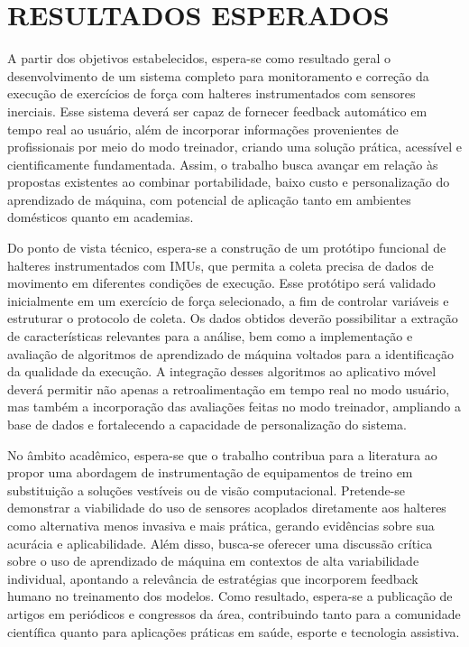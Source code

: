 \chapter{RESULTADOS ESPERADOS}
\label{cap:resultados}

A partir dos objetivos estabelecidos, espera-se como resultado geral o desenvolvimento de um sistema completo para monitoramento e correção da execução de exercícios de força com halteres instrumentados com sensores inerciais. Esse sistema deverá ser capaz de fornecer feedback automático em tempo real ao usuário, além de incorporar informações provenientes de profissionais por meio do modo treinador, criando uma solução prática, acessível e cientificamente fundamentada. Assim, o trabalho busca avançar em relação às propostas existentes ao combinar portabilidade, baixo custo e personalização do aprendizado de máquina, com potencial de aplicação tanto em ambientes domésticos quanto em academias.  

Do ponto de vista técnico, espera-se a construção de um protótipo funcional de halteres instrumentados com IMUs, que permita a coleta precisa de dados de movimento em diferentes condições de execução. Esse protótipo será validado inicialmente em um exercício de força selecionado, a fim de controlar variáveis e estruturar o protocolo de coleta. Os dados obtidos deverão possibilitar a extração de características relevantes para a análise, bem como a implementação e avaliação de algoritmos de aprendizado de máquina voltados para a identificação da qualidade da execução. A integração desses algoritmos ao aplicativo móvel deverá permitir não apenas a retroalimentação em tempo real no modo usuário, mas também a incorporação das avaliações feitas no modo treinador, ampliando a base de dados e fortalecendo a capacidade de personalização do sistema.  

No âmbito acadêmico, espera-se que o trabalho contribua para a literatura ao propor uma abordagem de instrumentação de equipamentos de treino em substituição a soluções vestíveis ou de visão computacional. Pretende-se demonstrar a viabilidade do uso de sensores acoplados diretamente aos halteres como alternativa menos invasiva e mais prática, gerando evidências sobre sua acurácia e aplicabilidade. Além disso, busca-se oferecer uma discussão crítica sobre o uso de aprendizado de máquina em contextos de alta variabilidade individual, apontando a relevância de estratégias que incorporem feedback humano no treinamento dos modelos. Como resultado, espera-se a publicação de artigos em periódicos e congressos da área, contribuindo tanto para a comunidade científica quanto para aplicações práticas em saúde, esporte e tecnologia assistiva.  

